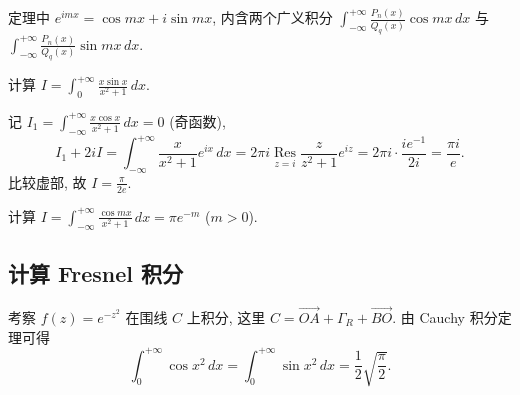 \documentclass[theorem=false,mathfont=none,openany,sub3section]{easybook}
\begin{document}
\begin{remark}
  定理中 $e^{imx}=\cos mx+i\sin mx$, 内含两个广义积分
  $\displaystyle\int_{-\infty}^{+\infty}\frac{P_{n}(x)}{Q_{q}(x)}\cos mx\,dx$ 与
  $\displaystyle\int_{-\infty}^{+\infty}\frac{P_{n}(x)}{Q_{q}(x)}\sin mx\,dx$.
\end{remark}

\begin{example}
  计算 $I=\int_{0}^{+\infty}\frac{x\sin x}{x^{2}+1}\,dx$.

  记 $I_{1}=\int_{-\infty}^{+\infty}\frac{x\cos x}{x^{2}+1}\,dx=0$ (奇函数),
  \[
  I_{1}+2iI=\int_{-\infty}^{+\infty}\frac{x}{x^{2}+1}e^{ix}\,dx
  =2\pi i\operatorname*{Res}_{z=i}\frac{z}{z^{2}+1}e^{iz}
  =2\pi i\cdot\frac{ie^{-1}}{2i}=\frac{\pi i}{e}.
  \]
  比较虚部, 故 $I=\frac{\pi}{2e}$.
\end{example}

\begin{example}
  计算 $I=\int_{-\infty}^{+\infty}\frac{\cos mx}{x^{2}+1}\,dx=\pi e^{-m}$ ($m>0$).
\end{example}

\subsection{计算 Fresnel 积分}

考察 $f(z)=e^{-z^{2}}$ 在围线 $C$ 上积分, 这里 $C=\overrightarrow{OA}+\Gamma_{R}+\overrightarrow{BO}$. 由 Cauchy 积分定理可得
\[
\int_{0}^{+\infty}\cos x^{2}\,dx=\int_{0}^{+\infty}\sin x^{2}\,dx=\frac{1}{2}\sqrt{\frac{\pi}{2}}.
\]
\end{document}
